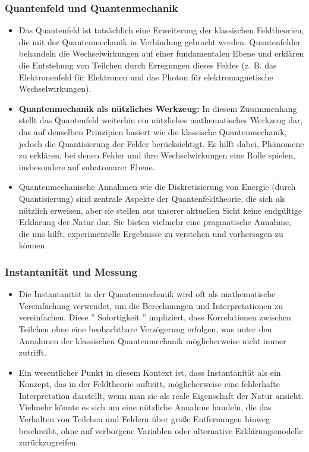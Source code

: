 \documentclass[12pt,a4paper]{article}
\begin{document}
	\subsubsection{Quantenfeld und Quantenmechanik}
	\begin{itemize}
		\item Das Quantenfeld ist tatsächlich eine Erweiterung der klassischen Feldtheorien, die mit der Quantenmechanik in Verbindung gebracht werden. Quantenfelder behandeln die Wechselwirkungen auf einer fundamentalen Ebene und erklären die Entstehung von Teilchen durch Erregungen dieses Feldes (z. B. das Elektronenfeld für Elektronen und das Photon für elektromagnetische Wechselwirkungen).
		\item \textbf{Quantenmechanik als nützliches Werkzeug:} In diesem Zusammenhang stellt das Quantenfeld weiterhin ein nützliches mathematisches Werkzeug dar, das auf denselben Prinzipien basiert wie die klassische Quantenmechanik, jedoch die Quantisierung der Felder berücksichtigt. Es hilft dabei, Phänomene zu erklären, bei denen Felder und ihre Wechselwirkungen eine Rolle spielen, insbesondere auf subatomarer Ebene.
		\item Quantenmechanische Annahmen wie die Diskretisierung von Energie (durch Quantisierung) sind zentrale Aspekte der Quantenfeldtheorie, die sich als nützlich erweisen, aber sie stellen aus unserer aktuellen Sicht keine endgültige Erklärung der Natur dar. Sie bieten vielmehr eine pragmatische Annahme, die uns hilft, experimentelle Ergebnisse zu verstehen und vorhersagen zu können.
	\end{itemize}
	
	\subsubsection{Instantanität und Messung}
	\begin{itemize}
		\item Die Instantanität in der Quantenmechanik wird oft als mathematische Vereinfachung verwendet, um die Berechnungen und Interpretationen zu vereinfachen. Diese '' Sofortigkeit '' impliziert, dass Korrelationen zwischen Teilchen ohne eine beobachtbare Verzögerung erfolgen, was unter den Annahmen der klassischen Quantenmechanik möglicherweise nicht immer zutrifft.
		\item Ein wesentlicher Punkt in diesem Kontext ist, dass Instantanität als ein Konzept, das in der Feldtheorie auftritt, möglicherweise eine fehlerhafte Interpretation darstellt, wenn man sie als reale Eigenschaft der Natur ansieht. Vielmehr könnte es sich um eine nützliche Annahme handeln, die das Verhalten von Teilchen und Feldern über große Entfernungen hinweg beschreibt, ohne auf verborgene Variablen oder alternative Erklärungsmodelle zurückzugreifen.
	\end{itemize}
	
\end{document}
